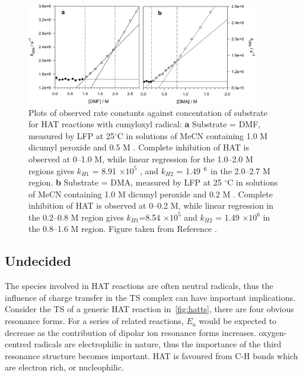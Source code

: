 \begin{figure}[htb]
  \centering
  \includegraphics[width=0.9\textwidth]{figures/exptdmadmf}
  \caption[Plots of observed rate constants against concentration of substrate for HAT
  reactions with cumyloxyl radical.]{Plots of observed rate constants against
    concentation of substrate for HAT reactions with cumyloxyl radical: \textbf{a}
    Substrate = DMF, measured by LFP at 25$^{\circ}$C in solutions of MeCN containing 1.0 M dicumyl peroxide and 0.5 M . Complete inhibition of HAT is observed at 0--1.0 M, while linear regression for the 1.0--2.0 M regions gives $k_{H1}$ = 8.91 $\times 10^5$ \Ms, and $k_{H2}$ = 1.49 $\time 10^6$ \Ms in the 2.0--2.7 M region. \textbf{b} Substrate = DMA, measured by LFP at 25 $^{\circ}$C in solutions of MeCN containing 1.0 M dicumyl peroxide and 0.2 M . Complete inhibition of HAT is observed at 0--0.2 M, while linear regression in the 0.2--0.8 M region gives $k_{H1}$=8.54 $\times 10^5$ \Ms and $k_{H2}$ = 1.49 $\times 10^6$ \Ms in the 0.8--1.6 M region. Figure taken from Reference .}
\label{fig:expdmadmf}
\end{figure}

\subsection{Undecided}
The species involved in HAT reactions are often neutral radicals, thus the influence of charge transfer in the TS complex can have important implications. Consider the TS of a generic HAT reaction in~\ref{fig:hatts}, there are four obvious resonance forms. For a series of related reactions, $E_a$ would be expected to decrease as the contribution of dipolar ion resonance forms increases.\cite{Roberts1999} oxygen-centred radicals are electrophilic in nature, thus the importance of the third resonance structure becomes important. HAT is favoured from C-H bonds which are electron rich, or nucleophilic.\cite{Salamone2015Rev}

